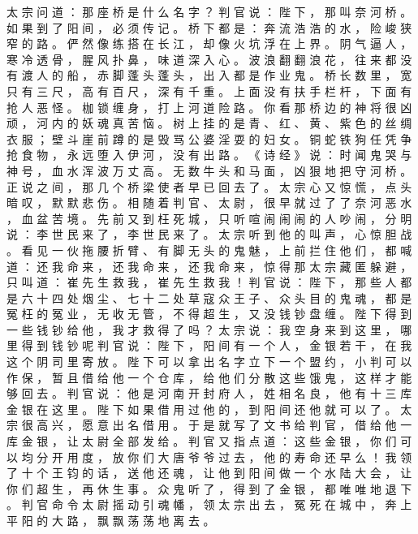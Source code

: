 {太 宗 问 道 ： 那 座 桥 是 什 么 名 字 ？ 判 官 说 ： 陛 下 ， 那 叫 奈 河 桥 。
如 果 到 了 阳 间 ， 必 须 传 记 。
桥 下 都 是 ： 奔 流 浩 浩 的 水 ， 险 峻 狭 窄 的 路 。
俨 然 像 练 搭 在 长 江 ， 却 像 火 坑 浮 在 上 界 。
阴 气 逼 人 ， 寒 冷 透 骨 ， 腥 风 扑 鼻 ， 味 道 深 入 心 。
波 浪 翻 翻 浪 花 ， 往 来 都 没 有 渡 人 的 船 ， 赤 脚 蓬 头 蓬 头 ， 出 入 都 是 作 业 鬼 。
桥 长 数 里 ， 宽 只 有 三 尺 ， 高 有 百 尺 ， 深 有 千 重 。
上 面 没 有 扶 手 栏 杆 ， 下 面 有 抢 人 恶 怪 。
枷 锁 缠 身 ， 打 上 河 道 险 路 。
你 看 那 桥 边 的 神 将 很 凶 顽 ， 河 内 的 妖 魂 真 苦 恼 。
树 上 挂 的 是 青 、 红 、 黄 、 紫 色 的 丝 绸 衣 服 ； 壁 斗 崖 前 蹲 的 是 毁 骂 公 婆 淫 耍 的 妇 女 。
铜 蛇 铁 狗 任 凭 争 抢 食 物 ， 永 远 堕 入 伊 河 ， 没 有 出 路 。
《 诗 经 》 说 ： 时 闻 鬼 哭 与 神 号 ， 血 水 浑 波 万 丈 高 。
无 数 牛 头 和 马 面 ， 凶 狠 地 把 守 河 桥 。
正 说 之 间 ， 那 几 个 桥 梁 使 者 早 已 回 去 了 。
太 宗 心 又 惊 慌 ， 点 头 暗 叹 ， 默 默 悲 伤 。
相 随 着 判 官 、 太 尉 ， 很 早 就 过 了 了 奈 河 恶 水 ， 血 盆 苦 境 。
先 前 又 到 枉 死 城 ， 只 听 喧 闹 闹 闹 的 人 吵 闹 ， 分 明 说 ： 李 世 民 来 了 ， 李 世 民 来 了 。
太 宗 听 到 他 的 叫 声 ， 心 惊 胆 战 。
看 见 一 伙 拖 腰 折 臂 、 有 脚 无 头 的 鬼 魅 ， 上 前 拦 住 他 们 ， 都 喊 道 ： 还 我 命 来 ， 还 我 命 来 ， 还 我 命 来 ， 惊 得 那 太 宗 藏 匿 躲 避 ， 只 叫 道 ： 崔 先 生 救 我 ， 崔 先 生 救 我 ！ 判 官 说 ： 陛 下 ， 那 些 人 都 是 六 十 四 处 烟 尘 、 七 十 二 处 草 寇 众 王 子 、 众 头 目 的 鬼 魂 ， 都 是 冤 枉 的 冤 业 ， 无 收 无 管 ， 不 得 超 生 ， 又 没 钱 钞 盘 缠 。
陛 下 得 到 一 些 钱 钞 给 他 ， 我 才 救 得 了 吗 ？
太 宗 说 ： 我 空 身 来 到 这 里 ， 哪 里 得 到 钱 钞 呢 判 官 说 ： 陛 下 ， 阳 间 有 一 个 人 ， 金 银 若 干 ， 在 我 这 个 阴 司 里 寄 放 。
陛 下 可 以 拿 出 名 字 立 下 一 个 盟 约 ， 小 判 可 以 作 保 ， 暂 且 借 给 他 一 个 仓 库 ， 给 他 们 分 散 这 些 饿 鬼 ， 这 样 才 能 够 回 去 。
判 官 说 ： 他 是 河 南 开 封 府 人 ， 姓 相 名 良 ， 他 有 十 三 库 金 银 在 这 里 。
陛 下 如 果 借 用 过 他 的 ， 到 阳 间 还 他 就 可 以 了 。
太 宗 很 高 兴 ， 愿 意 出 名 借 用 。
于 是 就 写 了 文 书 给 判 官 ， 借 给 他 一 库 金 银 ， 让 太 尉 全 部 发 给 。
判 官 又 指 点 道 ： 这 些 金 银 ， 你 们 可 以 均 分 开 用 度 ， 放 你 们 大 唐 爷 爷 过 去 ， 他 的 寿 命 还 早 么 ！
我 领 了 十 个 王 钧 的 话 ， 送 他 还 魂 ， 让 他 到 阳 间 做 一 个 水 陆 大 会 ， 让 你 们 超 生 ， 再 休 生 事 。
众 鬼 听 了 ， 得 到 了 金 银 ， 都 唯 唯 地 退 下 。
判 官 命 令 太 尉 摇 动 引 魂 幡 ， 领 太 宗 出 去 ， 冤 死 在 城 中 ， 奔 上 平 阳 的 大 路 ， 飘 飘 荡 荡 地 离 去 。
}
